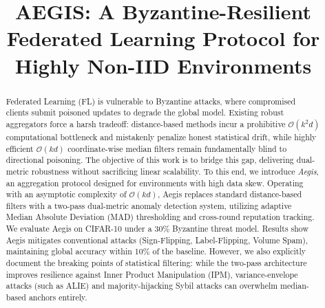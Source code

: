 \documentclass[10pt, conference]{IEEEtran}
\begin{document}
\title{AEGIS: A Byzantine-Resilient Federated Learning Protocol for Highly Non-IID Environments}

\author{
\and
{}
}

\maketitle

\begin{abstract}
Federated Learning (FL) is vulnerable to Byzantine attacks, where compromised clients submit poisoned updates to degrade the global model. Existing robust aggregators force a harsh tradeoff: distance-based methods incur a prohibitive $\mathcal{O}(k^2d)$ computational bottleneck and mistakenly penalize honest statistical drift, while highly efficient $\mathcal{O}(kd)$ coordinate-wise median filters remain fundamentally blind to directional poisoning. The objective of this work is to bridge this gap, delivering dual-metric robustness without sacrificing linear scalability. To this end, we introduce \textit{Aegis}, an aggregation protocol designed for environments with high data skew. Operating with an asymptotic complexity of $\mathcal{O}(kd)$, Aegis replaces standard distance-based filters with a two-pass dual-metric anomaly detection system, utilizing adaptive Median Absolute Deviation (MAD) thresholding and cross-round reputation tracking. We evaluate Aegis on CIFAR-10 under a 30\% Byzantine threat model. Results show Aegis mitigates conventional attacks (Sign-Flipping, Label-Flipping, Volume Spam), maintaining global accuracy within 10\% of the baseline. However, we also explicitly document the breaking points of statistical filtering: while the two-pass architecture improves resilience against Inner Product Manipulation (IPM), variance-envelope attacks (such as ALIE) and majority-hijacking Sybil attacks can overwhelm median-based anchors entirely.
\end{abstract}
\end{document}
